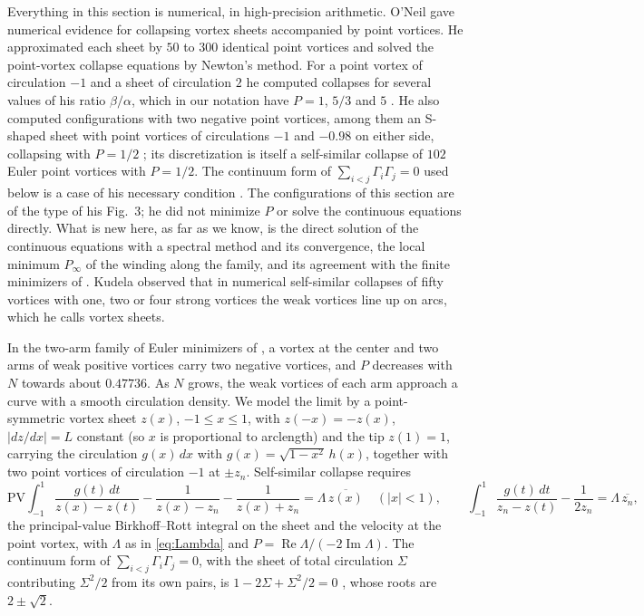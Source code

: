 \documentclass[11pt]{article}
\theoremstyle{definition}
\newcommand{\re}{\operatorname{Re}}
\newcommand{\im}{\operatorname{Im}}
\begin{document}
Everything in this section is numerical, in high-precision arithmetic. O'Neil \cite{oneil2010} gave numerical evidence for collapsing vortex sheets accompanied by point vortices. He approximated each sheet by $50$ to $300$ identical point vortices and solved the point-vortex collapse equations by Newton's method. For a point vortex of circulation $-1$ and a sheet of circulation $2$ he computed collapses for several values of his ratio $\beta/\alpha$, which in our notation have $P = 1$, $5/3$ and $5$ \cite[Figs.~1, 2]{oneil2010}. He also computed configurations with two negative point vortices, among them an S-shaped sheet with point vortices of circulations $-1$ and $-0.98$ on either side, collapsing with $P = 1/2$ \cite[Fig.~3]{oneil2010}; its discretization is itself a self-similar collapse of $102$ Euler point vortices with $P = 1/2$. The continuum form of $\sum_{i<j}\Gamma_i\Gamma_j = 0$ used below is a case of his necessary condition \cite[Eq.~(6a)]{oneil2010}. The configurations of this section are of the type of his Fig.~3; he did not minimize $P$ or solve the continuous equations directly. What is new here, as far as we know, is the direct solution of the continuous equations with a spectral method and its convergence, the local minimum $P_\infty$ of the winding along the family, and its agreement with the finite minimizers of \cite[Sect.~7]{mw2026}. Kudela \cite{kudela2021} observed that in numerical self-similar collapses of fifty vortices with one, two or four strong vortices the weak vortices line up on arcs, which he calls vortex sheets.

In the two-arm family of Euler minimizers of \cite[Sect.~7]{mw2026}, a vortex at the center and two arms of weak positive vortices carry two negative vortices, and $P$ decreases with $N$ towards about $0.47736$. As $N$ grows, the weak vortices of each arm approach a curve with a smooth circulation density. We model the limit by a point-symmetric vortex sheet $z(x)$, $-1 \le x \le 1$, with $z(-x) = -z(x)$, $|dz/dx| = L$ constant (so $x$ is proportional to arclength) and the tip $z(1) = 1$, carrying the circulation $g(x)\,dx$ with $g(x) = \sqrt{1 - x^2}\,h(x)$, together with two point vortices of circulation $-1$ at $\pm z_n$. Self-similar collapse requires
\begin{equation}\label{eq:sheet}
  \mathrm{PV}\!\!\int_{-1}^{1} \frac{g(t)\,dt}{z(x) - z(t)} - \frac{1}{z(x) - z_n} - \frac{1}{z(x) + z_n} = \Lambda\,\overline{z(x)} \quad (|x| < 1), \qquad \int_{-1}^{1} \frac{g(t)\,dt}{z_n - z(t)} - \frac{1}{2z_n} = \Lambda\,\overline{z_n},
\end{equation}
the principal-value Birkhoff--Rott integral on the sheet and the velocity at the point vortex, with $\Lambda$ as in \eqref{eq:Lambda} and $P = \re\Lambda/(-2\im\Lambda)$. The continuum form of $\sum_{i<j}\Gamma_i\Gamma_j = 0$, with the sheet of total circulation $\Sigma$ contributing $\Sigma^2/2$ from its own pairs, is $1 - 2\Sigma + \Sigma^2/2 = 0$ \cite[Eq.~(6a)]{oneil2010}, whose roots are $2 \pm \sqrt{2}$.
\end{document}
